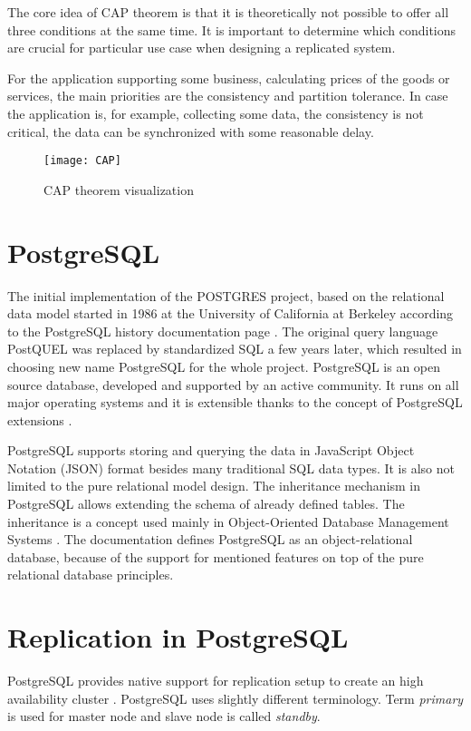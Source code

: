 \documentclass[
  digital, %
  twoside, %
  table,   %
  nolof,   %
  nolot,   %
]{fithesis3}
\begin{document}
The core idea of CAP theorem is that it is theoretically not possible to offer all three conditions at the same time. It is important to determine which conditions are crucial for particular use case when designing a replicated system.

For the application supporting some business, calculating prices of the goods or services, the main priorities are the consistency and partition tolerance. In case the application is, for example, collecting some data, the consistency is not critical, the data can be synchronized with some reasonable delay.

\begin{figure}[H]
\caption{CAP theorem visualization}
\centering
\texttt{[image: CAP]}
\label{fig:cap}
\end{figure}

\section{PostgreSQL} \label{sec:postgresql}
The initial implementation of the POSTGRES project, based on the relational data model started in 1986 at the University of California at Berkeley according to the PostgreSQL history documentation page \cite{pg_history}. The original query language PostQUEL was replaced by standardized SQL a few years later, which resulted in choosing new name PostgreSQL for the whole project. PostgreSQL is an open source database, developed and supported by an active community. It runs on all major operating systems and it is extensible thanks to the concept of PostgreSQL extensions \cite{pg_extensions}.

PostgreSQL supports storing and querying the data in JavaScript Object Notation (JSON) format besides many traditional SQL data types. It is also not limited to the pure relational model design. The inheritance mechanism in PostgreSQL \cite{inheritance} allows extending the schema of already defined tables. The inheritance is a concept used mainly in Object-Oriented Database Management Systems \cite{oodbms}. The documentation defines PostgreSQL as an object-relational database, because of the support for mentioned features on top of the pure relational database principles.

\section{Replication in PostgreSQL} \label{sec:pg_replication}
PostgreSQL provides native support for replication setup to create an high availability cluster \cite{pg_ha}. PostgreSQL uses slightly different terminology. Term \textit{primary} is used for master node and slave node is called \textit{standby}.
\end{document}
